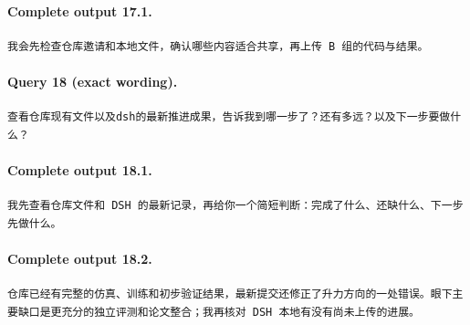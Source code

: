 \documentclass[UTF8,10pt]{ctexart}
\begin{document}
\paragraph{Complete output 17.1.}
\begin{Verbatim}[breaklines=true,breakanywhere=true,fontsize=\scriptsize,frame=single,framesep=2pt]
我会先检查仓库邀请和本地文件，确认哪些内容适合共享，再上传 B 组的代码与结果。
\end{Verbatim}

\paragraph{Query 18 (exact wording).}
\begin{Verbatim}[breaklines=true,breakanywhere=true,fontsize=\scriptsize,frame=single,framesep=2pt]
查看仓库现有文件以及dsh的最新推进成果，告诉我到哪一步了？还有多远？以及下一步要做什么？
\end{Verbatim}

\paragraph{Complete output 18.1.}
\begin{Verbatim}[breaklines=true,breakanywhere=true,fontsize=\scriptsize,frame=single,framesep=2pt]
我先查看仓库文件和 DSH 的最新记录，再给你一个简短判断：完成了什么、还缺什么、下一步先做什么。
\end{Verbatim}

\paragraph{Complete output 18.2.}
\begin{Verbatim}[breaklines=true,breakanywhere=true,fontsize=\scriptsize,frame=single,framesep=2pt]
仓库已经有完整的仿真、训练和初步验证结果，最新提交还修正了升力方向的一处错误。眼下主要缺口是更充分的独立评测和论文整合；我再核对 DSH 本地有没有尚未上传的进展。
\end{Verbatim}
\end{document}
